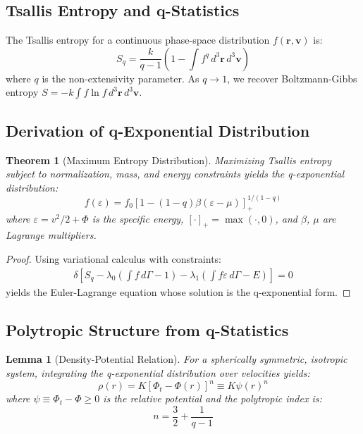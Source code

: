 \documentclass[12pt, a4paper]{article}
\newtheorem{theorem}{Theorem}
\newtheorem{lemma}{Lemma}
\theoremstyle{definition}
\theoremstyle{remark}
\begin{document}
\subsection{Tsallis Entropy and q-Statistics}

The Tsallis entropy for a continuous phase-space distribution $f(\mathbf{r},\mathbf{v})$ is:
\begin{equation}
S_q = \frac{k}{q-1}\left(1 - \int f^q \, d^3\mathbf{r} \, d^3\mathbf{v}\right)
\end{equation}
where $q$ is the non-extensivity parameter. As $q \to 1$, we recover Boltzmann-Gibbs entropy $S = -k\int f\ln f \, d^3\mathbf{r} \, d^3\mathbf{v}$.

\subsection{Derivation of q-Exponential Distribution}

\begin{theorem}[Maximum Entropy Distribution]
Maximizing Tsallis entropy subject to normalization, mass, and energy constraints yields the q-exponential distribution:
\begin{equation}
f(\varepsilon) = f_0 [1 - (1-q)\beta(\varepsilon - \mu)]_+^{1/(1-q)}
\end{equation}
where $\varepsilon = v^2/2 + \Phi$ is the specific energy, $[\cdot]_+ = \max(\cdot, 0)$, and $\beta$, $\mu$ are Lagrange multipliers.
\end{theorem}

\begin{proof}
Using variational calculus with constraints:
\begin{align}
\delta\left[S_q - \lambda_0\left(\int f \, d\Gamma - 1\right) - \lambda_1\left(\int f\varepsilon \, d\Gamma - E\right)\right] = 0
\end{align}
yields the Euler-Lagrange equation whose solution is the q-exponential form.
\end{proof}

\subsection{Polytropic Structure from q-Statistics}

\begin{lemma}[Density-Potential Relation]
For a spherically symmetric, isotropic system, integrating the q-exponential distribution over velocities yields:
\begin{equation}
\rho(r) = K[\Phi_t - \Phi(r)]^n \equiv K\psi(r)^n
\end{equation}
where $\psi \equiv \Phi_t - \Phi \geq 0$ is the relative potential and the polytropic index is:
\begin{equation}
n = \frac{3}{2} + \frac{1}{q-1}
\end{equation}
\end{lemma}
\end{document}
